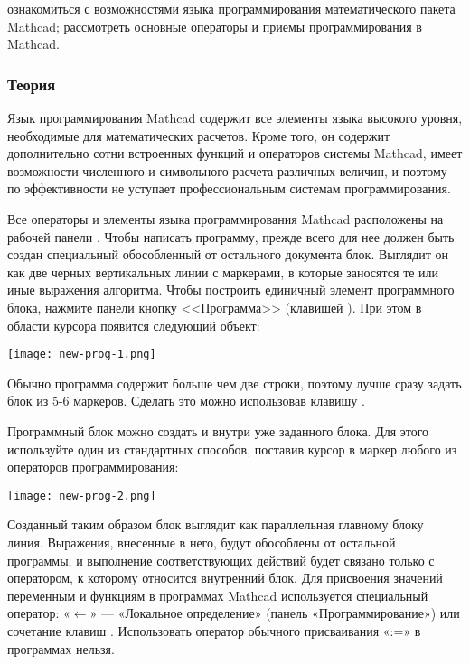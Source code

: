 
\goal ознакомиться с возможностями языка программирования математического пакета Mathcad; рассмотреть основные операторы и приемы программирования в Mathcad.

\subsubsection{Теория}
Язык программирования Mathcad содержит все элементы языка высокого уровня, необходимые для математических расчетов. Кроме того, он содержит дополнительно сотни встроенных функций и операторов системы Mathcad, имеет возможности численного и символьного расчета различных величин, и поэтому по эффективности не уступает профессиональным системам программирования.

Все операторы и элементы языка программирования Mathcad расположены на рабочей панели . 
Чтобы написать программу, прежде всего для нее должен быть создан специальный обособленный от остального документа блок. Выглядит он как две черных вертикальных линии с маркерами, в которые заносятся те или иные выражения алгоритма. Чтобы построить единичный элемент программного блока, нажмите панели кнопку <<Программа>> (клавишей \keys{]}). При этом в области курсора появится следующий объект:
\begin{center}
	\texttt{[image: new-prog-1.png]}
\end{center}

Обычно программа содержит больше чем две строки, поэтому лучше сразу задать блок из 5-6 маркеров. Сделать это можно использовав клавишу \keys{\enter}.

Программный блок можно создать и внутри уже заданного блока. Для этого используйте один из стандартных способов, поставив курсор в маркер любого из операторов программирования:
\begin{center}
	\texttt{[image: new-prog-2.png]}
\end{center}

Созданный таким образом блок выглядит как параллельная главному блоку линия. Выражения, внесенные в него, будут обособлены от остальной программы, и выполнение соответствующих действий будет связано только с оператором, к которому относится внутренний блок.
Для присвоения значений переменным и функциям в программах Mathcad используется специальный оператор: «$\leftarrow$» --- «Локальное определение» (панель «Программирование») или сочетание клавиш \keys{\shift + [} . Использовать оператор обычного присваивания «:=» в программах нельзя.

